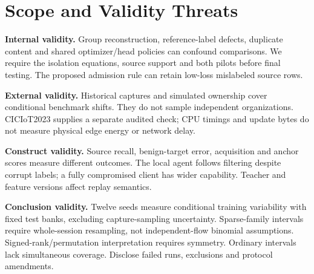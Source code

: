 \documentclass[10pt,a4paper]{article}
\begin{document}
\begin{figure}[htbp]
{
}
\end{figure}
\clearpage

\section{Scope and Validity Threats}
\textbf{Internal validity.} Group reconstruction, reference-label defects, duplicate content and shared optimizer/head policies can confound comparisons. We require the isolation equations, source support and both pilots before final testing. The proposed admission rule can retain low-loss mislabeled source rows.

\textbf{External validity.} Historical captures and simulated ownership cover conditional benchmark shifts. They do not sample independent organizations. CICIoT2023 supplies a separate audited check; CPU timings and update bytes do not measure physical edge energy or network delay.

\textbf{Construct validity.} Source recall, benign-target error, acquisition and anchor scores measure different outcomes. The local agent follows filtering despite corrupt labels; a fully compromised client has wider capability. Teacher and feature versions affect replay semantics.

\textbf{Conclusion validity.} Twelve seeds measure conditional training variability with fixed test banks, excluding capture-sampling uncertainty. Sparse-family intervals require whole-session resampling, not independent-flow binomial assumptions. Signed-rank/permutation interpretation requires symmetry. Ordinary intervals lack simultaneous coverage. Disclose failed runs, exclusions and protocol amendments.
\end{document}
